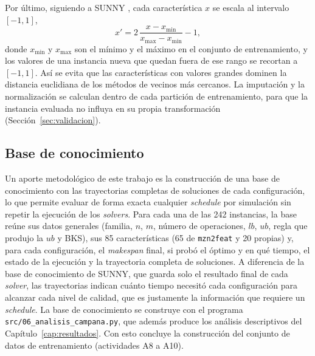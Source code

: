 Por último, siguiendo a SUNNY \citep{amadini2014sunny}, cada característica
$x$ se escala al intervalo $[-1, 1]$,
\begin{equation}
  x' = 2\,\frac{x - x_{\min}}{x_{\max} - x_{\min}} - 1,
  \label{eq:normalizacion}
\end{equation}
donde $x_{\min}$ y $x_{\max}$ son el mínimo y el máximo en el conjunto de
entrenamiento, y los valores de una instancia nueva que quedan fuera de ese
rango se recortan a $[-1, 1]$. Así se evita que las características con
valores grandes dominen la distancia euclidiana de los métodos de vecinos
más cercanos. La imputación y la normalización se calculan dentro de cada
partición de entrenamiento, para que la instancia evaluada no influya en su
propia transformación (Sección~\ref{sec:validacion}).

\subsection{Base de conocimiento}

Un aporte metodológico de este trabajo es la construcción de una base de
conocimiento con las trayectorias completas de soluciones de cada
configuración, lo que permite evaluar de forma exacta cualquier
\textit{schedule} por simulación sin repetir la ejecución de los
\textit{solvers}. Para cada una de las 242 instancias, la base reúne sus datos
generales (familia, $n$, $m$, número de operaciones, $lb$, $ub$, regla que
produjo la $ub$ y BKS), sus 85 características (65 de \texttt{mzn2feat} y 20
propias) y, para cada configuración, el \textit{makespan} final, si probó el
óptimo y en qué tiempo, el estado de la ejecución y la trayectoria completa
de soluciones. A diferencia de la base de conocimiento de SUNNY, que guarda
solo el resultado final de cada \textit{solver}, las trayectorias indican
cuánto tiempo necesitó cada configuración para alcanzar cada nivel de calidad,
que es justamente la información que requiere un \textit{schedule}. La base de
conocimiento se construye con el programa \texttt{src/06\_analisis\_campana.py},
que además produce los análisis descriptivos del
Capítulo~\ref{cap:resultados}. Con esto concluye la construcción del conjunto
de datos de entrenamiento (actividades A8 a A10).
